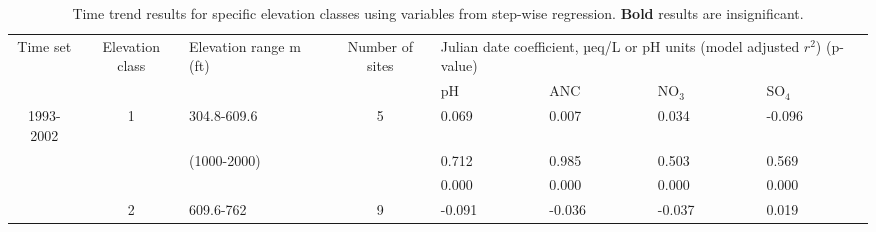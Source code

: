 \begin{table}[p]\scriptsize
\caption{Time trend results for specific elevation classes using variables from step-wise regression. \textbf{Bold} results are insignificant.}
\begin{tabular}{cclcllll}
\toprule
\multicolumn{1}{m{.5cm}}{Time set} & \multicolumn{1}{m{1cm}}{Elevation class} &\multicolumn{1}{m{2cm}}{ Elevation range m (ft)} & \multicolumn{1}{m{1cm}}{Number of sites} & \multicolumn{4}{m{8cm}}{Julian date coefficient, µeq/L or pH units (model adjusted $r^2$) (p-value)}   \\ \cline{5-8}\noalign{\smallskip}
                                                               &                                                                 &                                                                                &                                                                       & \multicolumn{ 1}{m{2cm}}{pH} & \multicolumn{1}{m{2cm}}{ANC} & \multicolumn{1}{m{2cm}}{NO$_3$} & \multicolumn{1}{m{2cm}}{SO$_4$} \\ 
 \midrule
1993-2002                                              & 1                                                              & 304.8-609.6                                                           & 5                                                                    &  0.069                                       & 0.007                                          & 0.034                                              & -0.096  \\ 
                                                               &                                                                 & (1000-2000)                                                           &                                                                       &  0.712                                       & 0.985                                           & 0.503                                             & 0.569  \\ 
                                                               &                                                                 &                                                                                &                                                                        &  0.000                                      & 0.000                                           & 0.000                                              & 0.000  \\ \cline{5-8}\noalign{\smallskip}
                                                               &  2                                                             & 609.6-762                                                              & 9                                                                     &  -0.091                                     & -0.036                                         & -0.037                                             & 0.019  \\ 

\end{tabular}
\end{table}
